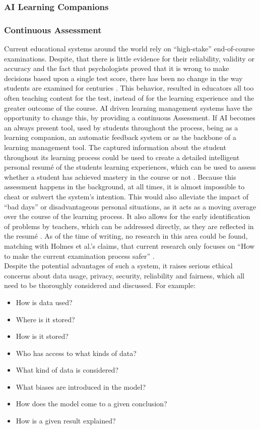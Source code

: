 \documentclass{Academic}
\begin{document}
    \subsubsection{AI Learning Companions}

    \subsubsection{Continuous Assessment}
    Current educational systems around the world rely on \enquote{high-stake} end-of-course examinations. Despite, that there is little evidence for their reliability, validity or accuracy and the fact that psychologists proved that it is wrong to make decisions based upon a single test score, there has been no change in the way students are examined for centuries \cite{holmes_artificial_2023}. This behavior, resulted in educators all too often teaching content for the test, instead of for the learning experience and the greater outcome of the course. AI driven learning management systems have the opportunity to change this, by providing a continuous Assessment. If AI becomes an always present tool, used by students throughout the process, being as a learning companion, an automatic feedback system or as the backbone of a learning management tool. The captured information about the student throughout its learning process could be used to create a detailed intelligent personal resumé of the students learning experiences, which can be used to assess whether a student has achieved mastery in the course or not \cite{holmes_artificial_2023}. Because this assessment happens in the background, at all times, it is almost impossible to cheat or subvert the system's intention. This would also alleviate the impact of \enquote{bad days} or disadvantageous personal situations, as it acts as a moving average over the course of the learning process. It also allows for the early identification of problems by teachers, which can be addressed directly, as they are reflected in the resumé \cite{holmes_artificial_2023}. As of the time of writing, no research in this area could be found, matching with Holmes et al.'s claims, that current research only focuses on \enquote{How to make the current examination process safer} \cite{holmes_artificial_2023}.\\
    Despite the potential advantages of such a system, it raises serious ethical concerns about data usage, privacy, security, reliability and fairness, which all need to be thoroughly considered and discussed. For example:
    \begin{itemize}
        \item How is data used?
        \item Where is it stored?
        \item How is it stored?
        \item Who has access to what kinds of data?
        \item What kind of data is considered?
        \item What biases are introduced in the model?
        \item How does the model come to a given conclusion?
        \item How is a given result explained?
    \end{itemize}
\end{document}
